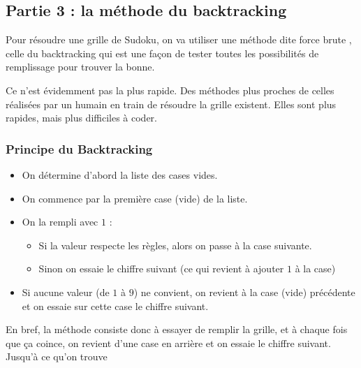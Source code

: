 \documentclass[a4paper,french,11pt,twoside]{VcCours}
\begin{document}
 \subsection*{Partie 3 : la méthode du backtracking}
Pour résoudre une grille de Sudoku, on va utiliser une méthode dite \og force brute \fg,
celle du \og backtracking \fg{} qui est une façon de tester toutes les possibilités de remplissage pour trouver la bonne.

\medskip

Ce n'est évidemment pas la plus rapide. Des méthodes plus proches de celles réalisées par un humain en train de résoudre la grille existent. Elles sont plus rapides, mais plus difficiles à coder.

\subsubsection*{Principe du Backtracking}
\begin{itemize}
    \item On détermine d'abord la liste des cases vides.
    \item On commence par la première case (vide) de la liste.
    \item On la rempli avec $1$ :
    \begin{itemize}
        \item Si la valeur respecte les règles, alors on passe à la case suivante.
        \item Sinon on essaie le chiffre suivant (ce qui revient à ajouter $1$ à la case)
    \end{itemize}
    \item Si aucune valeur (de $1$ à $9$) ne convient, on revient à la case (vide) 
    précédente et on essaie sur cette case le chiffre suivant.
\end{itemize}
En bref, la méthode consiste donc à essayer de remplir la grille, 
et à chaque fois que ça coince, on revient d'une case en arrière 
et on essaie le chiffre suivant. Jusqu'à ce qu'on trouve
\end{document}
